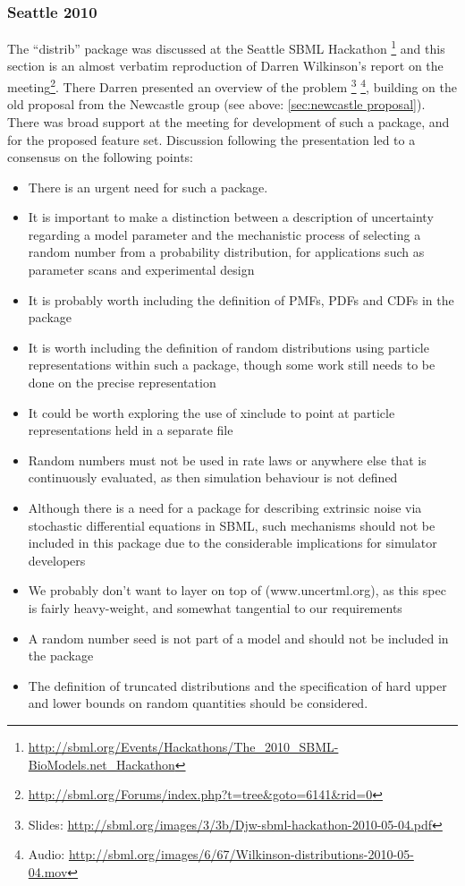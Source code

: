 \documentclass[draftspec]{sbmlpkgspec}
\begin{document}
\subsubsection{Seattle 2010}

The ``distrib'' package was discussed at the Seattle SBML Hackathon%
\footnote{\url{http://sbml.org/Events/Hackathons/The_2010_SBML-BioModels.net_Hackathon}}
and this section is an almost verbatim reproduction of Darren
Wilkinson's report on the
meeting\footnote{\url{http://sbml.org/Forums/index.php?t=tree\&goto=6141\&rid=0}}. There
Darren presented an overview of the problem%
\footnote{Slides: \url{http://sbml.org/images/3/3b/Djw-sbml-hackathon-2010-05-04.pdf}}%
\footnote{Audio: \url{http://sbml.org/images/6/67/Wilkinson-distributions-2010-05-04.mov}},
building on the old proposal from the Newcastle group (see above:
\ref{sec:newcastle proposal}).  There was broad support at the meeting
for development of such a package, and for the proposed feature
set. Discussion following the presentation led to a consensus on the
following points:

\begin{itemize}
\item There is an urgent need for such a package.
\item It is important to make a distinction between a description of
  uncertainty regarding a model parameter and the mechanistic process
  of selecting a random number from a probability distribution, for
  applications such as parameter scans and experimental design
\item It is probably worth including the definition of PMFs, PDFs and CDFs in the package
\item It is worth including the definition of random distributions using particle representations within such a package, though some work
 still needs to be done on the precise representation
\item It could be worth exploring the use of xinclude to point at particle
representations held in a separate file
\item Random numbers must not be used in rate laws or anywhere else that
 is continuously evaluated, as then simulation behaviour is not
 defined
\item Although there is a need for a package for describing extrinsic
 noise via stochastic differential equations in SBML, such mechanisms
 should not be included in this package due to the considerable
 implications for simulator developers
\item We probably don't want to layer on top of \uncertml
 (www.uncertml.org), as this spec is fairly heavy-weight, and
 somewhat tangential to our requirements
\item A random number seed is not part of a model and should not be
 included in the package
\item The definition of truncated distributions and the specification of
 hard upper and lower bounds on random quantities should be
 considered.
\end{itemize}
\end{document}
